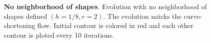 \documentclass[review]{siamart220329}
\begin{document}
\begin{figure}
	\caption{\textbf{No neighborhood of shapes}. Evolution with no neighborhood of shapes defined $(h=1/8,r=2)$. The evolution miicks the curve-shortening flow. Initial contour is colored in red and each other contour is ploted every 10 iterations.}
	\label{fig:no-neighborhood-shapes-evolution}
\end{figure}
%
%
%
%
\end{document}
